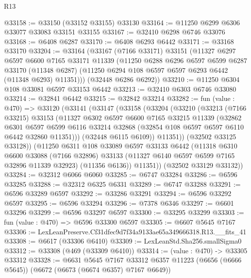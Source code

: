 \begin{lexlean}{R13}
\begin{coremodule}
@33158 := @33150 (@33152 @33155) @33130
@33164 := @11250 @6299 @6306 @33077 @33083 @33151 @33155
@33167 := @32410 @6298 @6746 @33076
@33168 := @6408 @6287
@33170 := @6408 @6293 @6442
@33171 := @33168 @33170
@33204 := @33164
    (@33167
      (@7166 @33171)
      @33151
      (@11327
        @6297
        @6597
        @6600
        @7165
        @33171
        @11339
        (@11250
          @6288
          @6296
          @6597
          @6599
          @6287
          @33170
          (@11348 @6287)
          (@11250 @6294 @108 @6597 @6597 @6293 @6442 (@11348 @6293) @11351)))
      (@32448 @6286 @6292))
@33210 := @11250 @6304 @108 @33081 @6597 @33153 @6442
@33213 := @32410 @6303 @6746 @33080
@33214 := @32841 @6442
@33215 := @32842 @33214
@33282 := fun (value : @470) =>
  @33120
    (@33141
      (@33147
        (@33158
          (@33204
            (@33210
              (@33213
                (@7166 @33215)
                @33153
                (@11327
                  @6302
                  @6597
                  @6600
                  @7165
                  @33215
                  @11339
                  (@32862
                    @6301
                    @6597
                    @6599
                    @6116
                    @33214
                    @32868
                    (@32854 @108 @6597 @6597 @6110 @6442 @32860 @11351)))
                (@32448 @6115 @6109))
              @11351))
          (@32502 @33125 @33128))
        (@11250
          @6311
          @108
          @33089
          @6597
          @33133
          @6442
          (@11318
            @6310
            @6600
            @33088
            (@7166 @32896)
            @33133
            (@11327 @6140 @6597 @6599 @7165 @32896 @11339 @32923)
            (@11356 @6136))
          @11351))
      (@32502 @33129 @33132))
@33284 := @32312 @6066 @6060
@33285 := @6747 @33284
@33286 := @6596 @33285
@33288 := @32312 @6325 @6331
@33289 := @6747 @33288
@33291 := @6596 @33289 @6597
@33292 := @33286 @33291
@33294 := @6596 @33292 @6597
@33295 := @6596 @33294
@33296 := @7378 @6346
@33297 := @6601 @33296
@33299 := @6596 @33297 @6597
@33300 := @33295 @33299
@33303 := fun (value : @470) => @6596 @33300 @6597
@33305 := @6607 @5645 @7167
@33306 := LexLeanPreserve.Cf31dfec9d7f34a9133ae65a349666318.R13.__fits_41
@33308 := @6617 (@33306 @6410)
@33309 := LexLeanStd.Sha256.smallSigma0
@33312 := @33308 (@469 (@33309 @6410))
@33314 := (value : @470) -> @33305 @33312
@33328 := @6631
    @5645
    @7167
    @33312
    @6357
    @11223
    (@6656 (@6666 @5645))
    (@6672 (@6673 (@6674 @6357) @7167 @6649))

\end{coremodule}
\end{lexlean}
